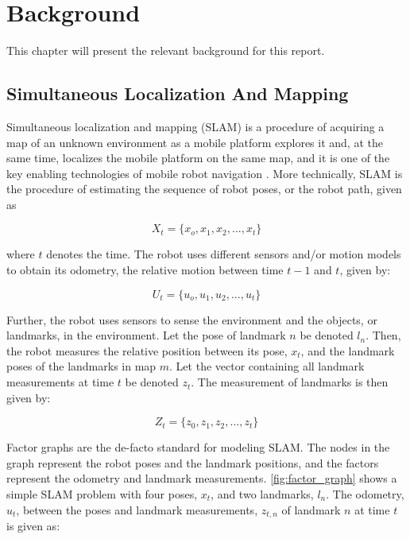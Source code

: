 \chapter{Background}

This chapter will present the relevant background for this report. 

\section{Simultaneous Localization And Mapping}

Simultaneous localization and mapping (SLAM) is a procedure of acquiring a map of an unknown environment as a mobile platform explores it and, at the same time, localizes the mobile platform on the same map, and it is one of the key enabling technologies of mobile robot navigation \cite{Stachniss2016SimultaneousMapping}. More technically, SLAM is the procedure of estimating the sequence of robot poses, or the robot path, given as  

\begin{equation}
    X_t = \{x_o, x_1, x_2,...,x_t\}
    \label{eq:path}
\end{equation}

where $t$ denotes the time. The robot uses different sensors and/or motion models to obtain its odometry, the relative motion between time $t-1$ and $t$, given by:

\begin{equation}
    U_t = \{u_o, u_1, u_2,...,u_t\}
    \label{eq:odom}
\end{equation}

Further, the robot uses sensors to sense the environment and the objects, or landmarks, in the environment. Let the pose of landmark $n$ be denoted $l_n$. Then, the robot measures the relative position between its pose, $x_t$, and the landmark poses of the landmarks in map $m$. Let the vector containing all landmark measurements at time $t$ be denoted $z_t$. The measurement of landmarks is then given by:

\begin{equation}
    Z_t = \{z_0, z_1, z_2,...,z_t\}
    \label{eq:landmark_measurements}
\end{equation}

Factor graphs are the de-facto standard for modeling SLAM. The nodes in the graph represent the robot poses and the landmark positions, and the factors represent the odometry and landmark measurements. \cref{fig:factor_graph} shows a simple SLAM problem with four poses, $x_t$, and two landmarks, $l_n$. The odometry, $u_t$, between the poses and landmark measurements, $z_{t,n}$ of landmark $n$ at time $t$ is given as:

